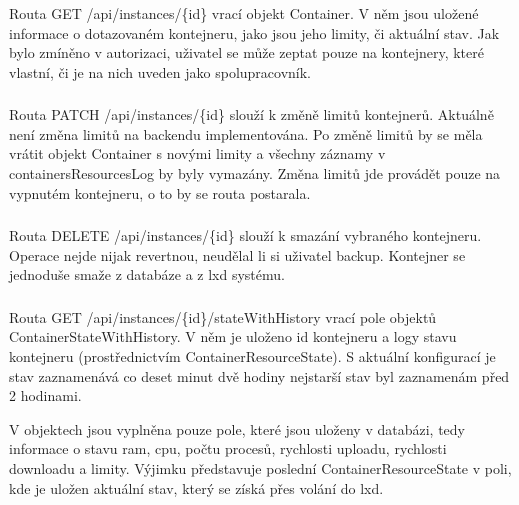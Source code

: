 \documentclass[a4paper,oneside,12pt]{report}
\begin{document}
Routa GET /api/instances/\{id\} vrací objekt Container.
V něm jsou uložené informace o dotazovaném kontejneru, jako jsou jeho limity, či aktuální stav.
Jak bylo zmíněno v autorizaci, uživatel se může zeptat pouze na kontejnery, které vlastní, či je na nich uveden jako spolupracovník.

\subsubsection{}

Routa PATCH /api/instances/\{id\} slouží k změně limitů kontejnerů.
Aktuálně není změna limitů na backendu implementována.
Po změně limitů by se měla vrátit objekt Container s novými limity a všechny záznamy v containersResourcesLog by byly vymazány.
Změna limitů jde provádět pouze na vypnutém kontejneru, o to by se routa postarala.

\subsubsection{}

Routa DELETE /api/instances/\{id\} slouží k smazání vybraného kontejneru.
Operace nejde nijak revertnou, neudělal li si uživatel backup.
Kontejner se jednoduše smaže z databáze a z lxd systému.

\subsubsection{}

Routa GET /api/instances/\{id\}/stateWithHistory vrací pole objektů ContainerStateWithHistory.
V něm je uloženo id kontejneru a logy stavu kontejneru (prostřednictvím ContainerResourceState).
S aktuální konfigurací je stav zaznamenává co deset minut dvě hodiny nejstarší stav byl zaznamenám před 2 hodinami.

V objektech jsou vyplněna pouze pole, které jsou uloženy v databázi, tedy informace o stavu ram, cpu, počtu procesů, rychlosti uploadu, rychlosti downloadu a limity.
Výjimku představuje poslední ContainerResourceState v poli, kde je uložen aktuální stav, který se získá přes volání do lxd.

\subsubsection{}
\end{document}
